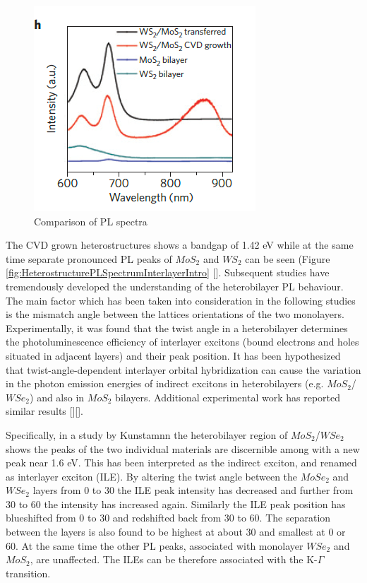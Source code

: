 \begin{figure}[h]
	\begin{center}
		\includegraphics[scale=1]{Heterostructures/HeterostructurePLSpectrumIntroComparison.png}
		\caption{Comparison of PL spectra}
		\label{fig:HeterostructurePLSpectrumIntroComparison}
	\end{center}
\end{figure}

The CVD grown heterostructures shows a bandgap of 1.42 eV while at the same time separate pronounced PL peaks of $MoS_2$ and $WS_2$ can be seen (Figure \ref{fig:HeterostructurePLSpectrumInterlayerIntro} [].  
Subsequent studies have tremendously developed the understanding of the heterobilayer PL behaviour. The main factor which has been taken into consideration in the following studies is the mismatch angle between the lattices orientations of the two monolayers.
Experimentally, it was found that the twist angle in a heterobilayer determines the photoluminescence efficiency of interlayer excitons (bound  electrons and holes situated in adjacent layers) and their peak position.
It has been hypothesized that twist-angle-dependent interlayer orbital hybridization can cause the variation in the photon emission energies of indirect excitons in heterobilayers (e.g. $MoS_2$/$WSe_2$) and also in $MoS_2$ bilayers. Additional experimental work has reported similar results [][]. 

Specifically, in a study by Kunstamnn \cite{Kunstmann2018} the heterobilayer region of $MoS_2$/$WSe_2$ shows the peaks of the two individual materials are discernible among with a new peak near 1.6 eV. This has been interpreted as the indirect exciton, and renamed as interlayer exciton (ILE). By altering the twist angle between the $MoSe_2$ and $WSe_2$ layers from 0{\degree} to 30{\degree} the ILE peak intensity has decreased and further from 30{\degree} to 60{\degree} the intensity has increased again. Similarly the ILE peak position has blueshifted from 0{\degree} to 30{\degree} and redshifted back from 30{\degree} to 60{\degree}. The separation between the layers is also found to be highest at about 30{\degree} and smallest at 0{\degree} or 60{\degree}. At the same time the other PL peaks, associated with monolayer $WSe_2$ and $MoS_2$, are unaffected. The ILEs can be therefore associated with the K-$\Gamma$ transition.

